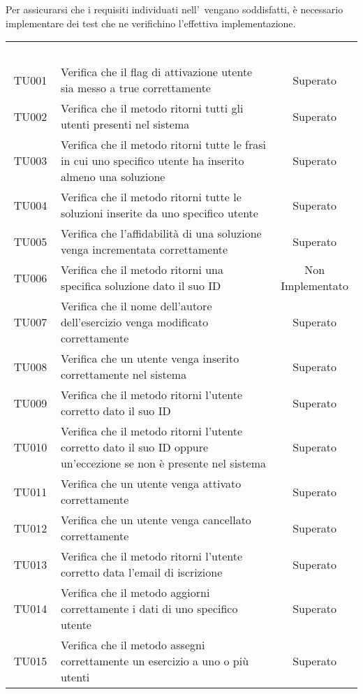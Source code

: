 Per assicurarsi che i requisiti individuati nell'\AdR \ vengano soddisfatti, è necessario implementare dei test che ne verifichino l'effettiva implementazione.


\begin{tabularx}{\textwidth}{cXc}
	
	\rowcolor{greySWEight}
	
		\rowcolor{greySWEight}
		\textcolor{white}{\textbf{Codice}} & 
		\textcolor{white}{\textbf{Descrizione}} &
		\textcolor{white}{\textbf{Stato}} \\
		
		TU001 & Verifica che il flag di attivazione utente sia messo a true correttamente & Superato \\
		TU002 & Verifica che il metodo ritorni tutti gli utenti presenti nel sistema & Superato \\
		TU003 & Verifica che il metodo ritorni tutte le frasi in cui uno specifico utente ha inserito almeno una soluzione & Superato \\
		TU004 & Verifica che il metodo ritorni tutte le soluzioni inserite da uno specifico utente & Superato \\
		TU005 & Verifica che l'affidabilità di una soluzione venga incrementata correttamente & Superato \\
		TU006 & Verifica che il metodo ritorni una specifica soluzione dato il suo ID & Non Implementato \\
		TU007 & Verifica che il nome dell'autore dell'esercizio venga modificato correttamente & Superato \\
		TU008 & Verifica che un utente venga inserito correttamente nel sistema & Superato \\
		TU009 & Verifica che il metodo ritorni l'utente corretto dato il suo ID & Superato \\
		TU010 & Verifica che il metodo ritorni l'utente corretto dato il suo ID oppure un'eccezione se non è presente nel sistema & Superato \\
		TU011 & Verifica che un utente venga attivato correttamente & Superato \\
		TU012 & Verifica che un utente venga cancellato correttamente & Superato \\
		TU013 & Verifica che il metodo ritorni l'utente corretto data l'email di iscrizione & Superato \\
		TU014 & Verifica che il metodo aggiorni correttamente i dati di uno specifico utente & Superato \\
		TU015 & Verifica che il metodo assegni correttamente un esercizio a uno o più utenti & Superato \\

\end{tabularx}
